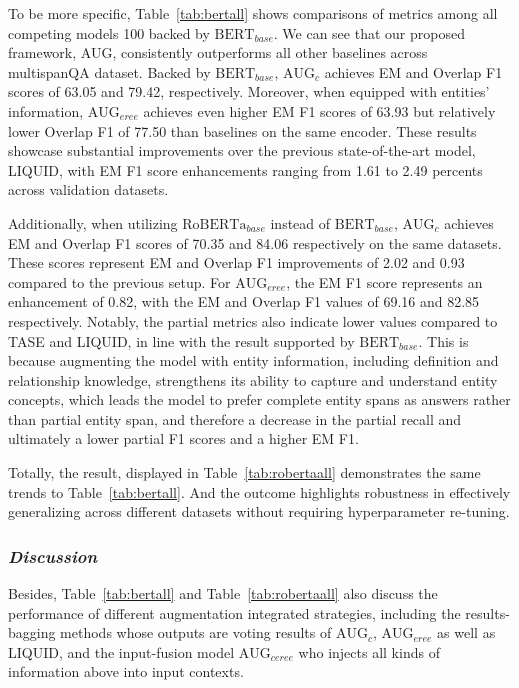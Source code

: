 \documentclass[a4paper,fleqn]{cas-dc}
\newcommand{\1}[1]{\mathds{1}\left[#1\right]}
\begin{document}
	To be more specific, Table~\ref{tab:bertall} shows comparisons of metrics among all competing models 100 backed by $\text{BERT}_{base}$. We can see that our proposed framework, AUG, consistently outperforms all other baselines across multispanQA dataset. Backed by $\text{BERT}_{base}$, $\text{AUG}_{c}$ achieves EM and Overlap F1 scores of 63.05 and 79.42, respectively. Moreover, when equipped with entities’ information,  $\text{AUG}_{eree}$ achieves even higher EM F1 scores of 63.93 but relatively lower Overlap F1 of 77.50 than baselines on the same encoder. These results showcase substantial improvements over the previous state-of-the-art model, LIQUID, with EM F1 score enhancements ranging from 1.61 to 2.49 percents across validation datasets. 
	
	Additionally, when utilizing $\text{RoBERTa}_{base}$ instead of $\text{BERT}_{base}$, $\text{AUG}_{c}$ achieves EM and Overlap F1 scores of 70.35 and 84.06 respectively on the same datasets. These scores represent EM and Overlap F1 improvements of 2.02 and 0.93 compared to the previous setup. For  $\text{AUG}_{eree}$, the EM F1 score represents an enhancement of 0.82, with the EM and Overlap F1 values of 69.16 and 82.85 respectively. Notably, the partial metrics also indicate lower values compared to TASE and LIQUID, in line with the result supported by $\text{BERT}_{base}$. This is because augmenting the model with entity information, including definition and relationship knowledge, strengthens its ability to capture and understand entity concepts, which leads the model to prefer complete entity spans as answers rather than partial entity span, and therefore a decrease in the partial recall and ultimately a lower partial F1 scores and a higher EM F1.
	
	Totally, the result, displayed in Table~\ref{tab:robertaall} demonstrates the same trends to Table~\ref{tab:bertall}. And the outcome highlights robustness in effectively generalizing across different datasets without requiring hyperparameter re-tuning. 
	
\subsubsection{\textit{Discussion}}
	Besides, Table~\ref{tab:bertall} and Table~\ref{tab:robertaall} also discuss the performance of different augmentation integrated strategies, including the results-bagging methods whose outputs are voting results of $\text{AUG}_{c}$, $\text{AUG}_{eree}$ as well as LIQUID, and the input-fusion model $\text{AUG}_{ceree}$ who injects all kinds of information above into input contexts.
	
\end{document}
